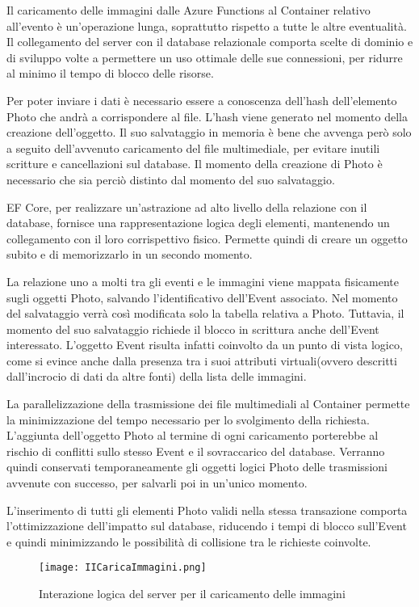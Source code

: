 Il caricamento delle immagini dalle Azure Functions al Container relativo all’evento è un’operazione lunga, soprattutto rispetto a tutte le altre eventualità. Il collegamento del server con il database relazionale comporta scelte di dominio e di sviluppo volte a permettere un uso ottimale delle sue connessioni, per ridurre al minimo il tempo di blocco delle risorse.

Per poter inviare i dati è necessario essere a conoscenza dell’hash dell’elemento Photo che andrà a corrispondere al file. L’hash viene generato nel momento della creazione dell’oggetto. Il suo salvataggio in memoria è bene che avvenga però solo a seguito dell’avvenuto caricamento del file multimediale, per evitare inutili scritture e cancellazioni sul database. Il momento della creazione di Photo è necessario che sia perciò distinto dal momento del suo salvataggio.

EF Core, per realizzare un’astrazione ad alto livello della relazione con il database, fornisce una rappresentazione logica degli elementi, mantenendo un collegamento con il loro corrispettivo fisico. Permette quindi di creare un oggetto subito e di  memorizzarlo in un secondo momento. 

La relazione uno a molti tra gli eventi e le immagini viene mappata fisicamente sugli oggetti Photo, salvando l’identificativo dell’Event associato. Nel momento del salvataggio verrà così modificata solo la tabella relativa a Photo. Tuttavia, il momento del suo salvataggio richiede il blocco in scrittura anche dell’Event interessato. L’oggetto Event risulta infatti coinvolto da un punto di vista logico, come si evince anche dalla presenza tra i suoi attributi virtuali(ovvero descritti dall’incrocio di dati da altre fonti) della lista delle immagini.

La parallelizzazione della trasmissione dei file multimediali al Container permette la minimizzazione del tempo necessario per lo svolgimento della richiesta. L’aggiunta dell’oggetto Photo al termine di ogni caricamento porterebbe al rischio di conflitti sullo stesso Event e il sovraccarico del database. Verranno quindi conservati temporaneamente gli oggetti logici Photo delle trasmissioni avvenute con successo, per salvarli poi in un’unico momento.

L’inserimento di tutti gli elementi Photo validi nella stessa transazione comporta  l'ottimizzazione dell’impatto sul database, riducendo i tempi di blocco sull’Event e quindi minimizzando le possibilità di collisione tra le richieste coinvolte.

\begin{figure}[h!]
    \centering
    \texttt{[image: IICaricaImmagini.png]}
    \caption{Interazione logica del server per il caricamento delle immagini }
\end{figure}

\clearpage